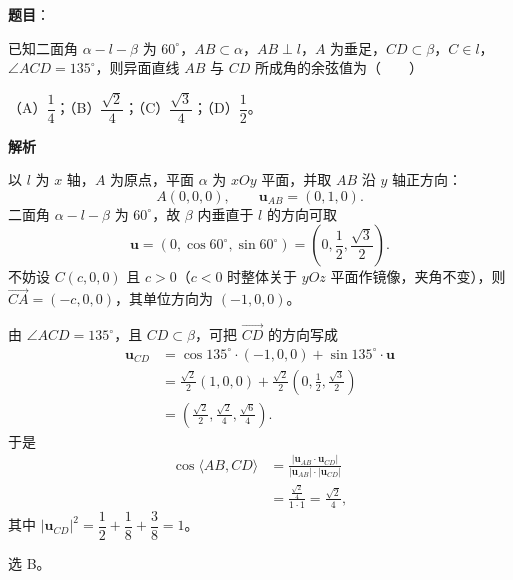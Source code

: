 \begin{answer}

\textbf{题目}：

已知二面角 $\alpha-l-\beta$ 为 $60^\circ$，$AB\subset\alpha$，$AB\perp l$，$A$ 为垂足，$CD\subset\beta$，$C\in l$，$\angle ACD=135^\circ$，则异面直线 $AB$ 与 $CD$ 所成角的余弦值为\mbox{（　　）}

（A）$\dfrac14$；（B）$\dfrac{\sqrt2}{4}$；（C）$\dfrac{\sqrt3}{4}$；（D）$\dfrac12$。

\textbf{解析}

以 $l$ 为 $x$ 轴，$A$ 为原点，平面 $\alpha$ 为 $xOy$ 平面，并取 $AB$ 沿 $y$ 轴正方向：
\nopagebreak[4]
\[A(0,0,0),\qquad \boldsymbol u_{AB}=(0,1,0).\]
二面角 $\alpha-l-\beta$ 为 $60^\circ$，故 $\beta$ 内垂直于 $l$ 的方向可取
\nopagebreak[4]
\[\boldsymbol u=(0,\cos60^\circ,\sin60^\circ)=\left(0,\frac12,\frac{\sqrt3}{2}\right).\]
不妨设 $C(c,0,0)$ 且 $c>0$（$c<0$ 时整体关于 $yOz$ 平面作镜像，夹角不变），则 $\overrightarrow{CA}=(-c,0,0)$，其单位方向为 $(-1,0,0)$。

由 $\angle ACD=135^\circ$，且 $CD\subset\beta$，可把 $\overrightarrow{CD}$ 的方向写成
\nopagebreak[4]
\[\begin{aligned}
\boldsymbol u_{CD}
&=\cos135^\circ\cdot(-1,0,0)+\sin135^\circ\cdot\boldsymbol u\\
&=\frac{\sqrt2}{2}(1,0,0)+\frac{\sqrt2}{2}\left(0,\frac12,\frac{\sqrt3}{2}\right)\\
&=\left(\frac{\sqrt2}{2},\frac{\sqrt2}{4},\frac{\sqrt6}{4}\right).
\end{aligned}\]
于是
\nopagebreak[4]
\[\begin{aligned}
\cos\langle AB,CD\rangle
&=\frac{|\boldsymbol u_{AB}\cdot\boldsymbol u_{CD}|}
{|\boldsymbol u_{AB}|\cdot|\boldsymbol u_{CD}|}\\
&=\frac{\frac{\sqrt2}{4}}{1\cdot1}=\frac{\sqrt2}{4},
\end{aligned}\]
其中 $|\boldsymbol u_{CD}|^2=\dfrac12+\dfrac18+\dfrac38=1$。

选 B。


\end{answer}
